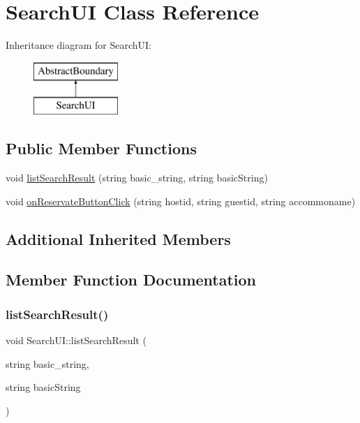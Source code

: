 \hypertarget{class_search_u_i}{}\section{Search\+UI Class Reference}
\label{class_search_u_i}
Inheritance diagram for Search\+UI\+:\begin{figure}[H]
\begin{center}
\leavevmode
\includegraphics[height=2.000000cm]{class_search_u_i}
\end{center}
\end{figure}
\subsection*{Public Member Functions}
\begin{DoxyCompactItemize}
\item 
void \mbox{\hyperlink{class_search_u_i_adb0e0b5eb6fd7d5d0a98f1eb0239e6d3}{list\+Search\+Result}} (string basic\+\_\+string, string basic\+String)
\item 
void \mbox{\hyperlink{class_search_u_i_a135ce7a4e608e1039612b926b85aac15}{on\+Reservate\+Button\+Click}} (string hostid, string guestid, string accommoname)
\end{DoxyCompactItemize}
\subsection*{Additional Inherited Members}


\subsection{Member Function Documentation}
\mbox{\label{class_search_u_i_adb0e0b5eb6fd7d5d0a98f1eb0239e6d3}} 
\subsubsection{\texorpdfstring{list\+Search\+Result()}{listSearchResult()}}
{\footnotesize\ttfamily void Search\+U\+I\+::list\+Search\+Result (\begin{DoxyParamCaption}\item[{string}]{basic\+\_\+string,  }\item[{string}]{basic\+String }\end{DoxyParamCaption})}

